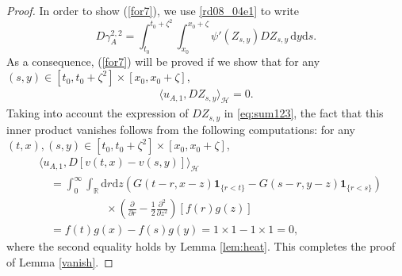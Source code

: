 \documentclass[12pt,a4paper]{article}
\newcommand{\R}{{\mathbb{R}}}
\newcommand{\HH}{\mathcal{H}}
\renewcommand{\d}{\mathrm{d}}
\newcommand {\deltah}{{\zeta}}
\newcommand{\<}{\langle}
\renewcommand{\>}{\rangle}
\begin{document}
 \begin{proof}
  In order to show (\ref{for7}),   we use \eqref{rd08_04e1} to write
 \[
 D\gamma_A^{2,2}=  \int_{t_0}^{t_0+\deltah^2}\int_{x_0}^{x_0+\deltah}\psi'(Z_{s,y})DZ_{s,y}\, \d y\d s .
 \]
 As a consequence,   (\ref{for7}) will be proved if we show that for any $(s,y)\in  [t_0,t_0+\deltah^2]\times [x_0,x_0+\deltah]$, 
 \begin{align*}%
 \langle u_{A,1}, DZ_{s,y} \rangle_\HH=0.
 \end{align*}
 Taking into account  the expression of $DZ_{s,y}$ in \eqref{eq:sum123}, the fact that this inner product vanishes  follows from the following computations: for any  $(t,x), (s,y)\in [t_0,t_0+\deltah^2]\times [x_0,x_0+\deltah]$,
 \begin{align*}
 & \langle u_{A,1}, D[v(t,x)-v(s,y)] \rangle_\HH \\
   &\quad= \int_0^\infty \int_{\R}\d r \d z \left(G(t-r,x-z)\mathbf{1}_{\{r<t\}} -G(s-r,y-z) \mathbf{1}_{\{ r< s\}} \right)\\
  &\qquad\qquad \qquad \times \left( \frac {\partial}{\partial r}-\frac 12 \frac {\partial^2}{\partial z^2} \right)
    \left[f(r)g(z) \right] \\
    &\quad=f(t)g(x)-f(s)g(y)=1\times 1-1\times 1=0,
    \end{align*}
    where the second equality holds by Lemma \ref{lem:heat}.
    This completes the proof of Lemma \ref{vanish}.
 \end{proof}
 
 
 
 
 
\end{document}
